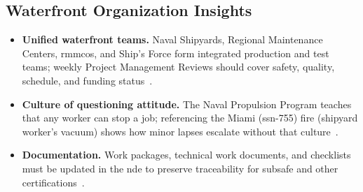 \documentclass[../main.tex]{subfiles}
\begin{document}
\subsection{Waterfront Organization Insights}
\begin{itemize}
  \item \textbf{Unified waterfront teams.} Naval Shipyards, Regional Maintenance Centers, \ac{rmmco}s, and Ship's Force form integrated production and test teams; weekly Project Management Reviews should cover safety, quality, schedule, and funding status~\autocite{edo-4-1-5-waterfront-work-control-2025}.
  \item \textbf{Culture of questioning attitude.} The Naval Propulsion Program teaches that any worker can stop a job; referencing the Miami (\ac{ssn}-755) fire (shipyard worker's vacuum) shows how minor lapses escalate without that culture~\autocite{edo-4-1-5-waterfront-work-control-2025}.
  \item \textbf{Documentation.} Work packages, technical work documents, and checklists must be updated in the \ac{nde} to preserve traceability for \ac{subsafe} and other certifications~\autocite{NAVSEA-0924-062-0010}.
\end{itemize}

\end{document}
